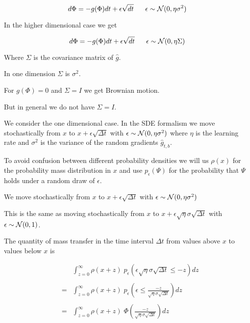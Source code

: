 {{\color{red} $$d\Phi =  -g(\Phi)dt + \epsilon \sqrt{dt}\;\;\;\;\;\; \epsilon \sim {\cal N}(0,\eta\sigma^2)$$}


In the higher dimensional case we get

{\color{red} $$d\Phi =  -g(\Phi)dt + \epsilon \sqrt{dt}\;\;\;\;\;\; \epsilon \sim {\cal N}(0,\eta\Sigma)$$}

\vfill
Where $\Sigma$ is the covariance matrix of $\hat{g}$.

\vfill
In one dimension $\Sigma$ is $\sigma^2$.

\vfill
For $g(\Phi) = 0$ and $\Sigma = I$ we get Brownian motion.

\vfill
But in general we do not have $\Sigma = I$.






{\Large
We consider the one dimensional case. In the SDE formalism we move stochastically from $x$ to $x + \epsilon \sqrt{\Delta t}$ with $\epsilon \sim {\cal N}(0,\eta\sigma^2)$
where $\eta$ is the learning rate and $\sigma^2$ is the variance of the random gradients $\hat{g}_{t,b}$.

\vfill
To avoid confusion between different probability densities we will us $\rho(x)$ for the probability mass distribution in $x$ and use $p_\epsilon(\Psi)$
for the probability that $\Psi$ holds under a random draw of $\epsilon$.

}

{\Large

We move stochastically from $x$ to $x + \epsilon \sqrt{\Delta t}$ with $\epsilon \sim {\cal N}(0,\eta\sigma^2)$

\vfill
This is the same as moving stochastically from $x$ to $x + \epsilon\sqrt{\eta}\sigma\sqrt{\Delta t}$ with $\epsilon \sim {\cal N}(0,1)$.

\vfill
The quantity of mass transfer in the time interval $\Delta t$ from values above $x$ to values below $x$ is


\begin{eqnarray*}
& & \int_{z = 0}^\infty  \rho(x + z)\;p_\epsilon(\epsilon\sqrt{\eta}\sigma\sqrt{\Delta t} \leq -z) dz  \\
\\
& = & \int_{z = 0}^\infty  \rho(x + z)\;p_\epsilon\left(\epsilon \leq \frac{-z}{\sqrt{\eta}\sigma\sqrt{\Delta t}}\right) dz  \\
\\
& =  & \int_{z = 0}^\infty \rho(x+z)\;\Phi\left(\frac{-z}{\sqrt{\eta}\sigma\sqrt{\Delta t}}\right) dz
\end{eqnarray*}

}}
